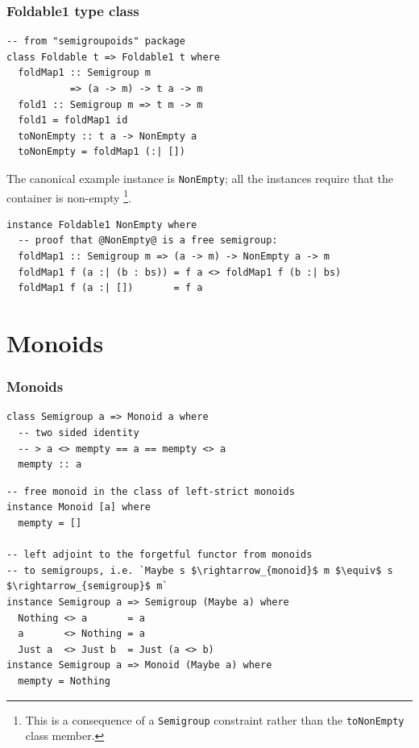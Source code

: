 \documentclass[t,dvipsnames,hyperref={colorlinks,citecolor=NavyBlue,linkcolor=NavyBlue,anchorcolor=NavyBlue,urlcolor=NavyBlue}]{beamer}
\begin{document}
\begin{frame}[fragile]
  \frametitle{Foldable1 type class}
  \vspace{-4mm}
  \begin{verbatim}
-- from "semigroupoids" package
class Foldable t => Foldable1 t where
  foldMap1 :: Semigroup m
           => (a -> m) -> t a -> m
  fold1 :: Semigroup m => t m -> m
  fold1 = foldMap1 id
  toNonEmpty :: t a -> NonEmpty a
  toNonEmpty = foldMap1 (:| [])
  \end{verbatim}
  \vspace{-5mm}
  \begin{examples}\footnotesize
    The canonical example instance is \texttt{NonEmpty}; all the instances
    require that the container is non-empty
    \footnote{This is a consequence of a \texttt{Semigroup} constraint rather
    than the \texttt{toNonEmpty} class
    member.}.
    \vspace{-2mm}
    \begin{verbatim}
instance Foldable1 NonEmpty where
  -- proof that @NonEmpty@ is a free semigroup:
  foldMap1 :: Semigroup m => (a -> m) -> NonEmpty a -> m
  foldMap1 f (a :| (b : bs)) = f a <> foldMap1 f (b :| bs)
  foldMap1 f (a :| [])       = f a
    \end{verbatim}
  \end{examples}
\end{frame}

\section{Monoids}

\begin{frame}[fragile]
  \frametitle{Monoids}
  \begin{verbatim}
class Semigroup a => Monoid a where
  -- two sided identity
  -- > a <> mempty == a == mempty <> a
  mempty :: a
  \end{verbatim}

  \vspace{-2mm}
  \begin{examples}\small
    \vspace{-2mm}
    \begin{verbatim}
-- free monoid in the class of left-strict monoids
instance Monoid [a] where
  mempty = []

-- left adjoint to the forgetful functor from monoids
-- to semigroups, i.e. `Maybe s $\rightarrow_{monoid}$ m $\equiv$ s $\rightarrow_{semigroup}$ m`
instance Semigroup a => Semigroup (Maybe a) where
  Nothing <> a       = a
  a       <> Nothing = a
  Just a  <> Just b  = Just (a <> b)
instance Semigroup a => Monoid (Maybe a) where
  mempty = Nothing
    \end{verbatim}
  \end{examples}
\end{frame}
\end{document}
